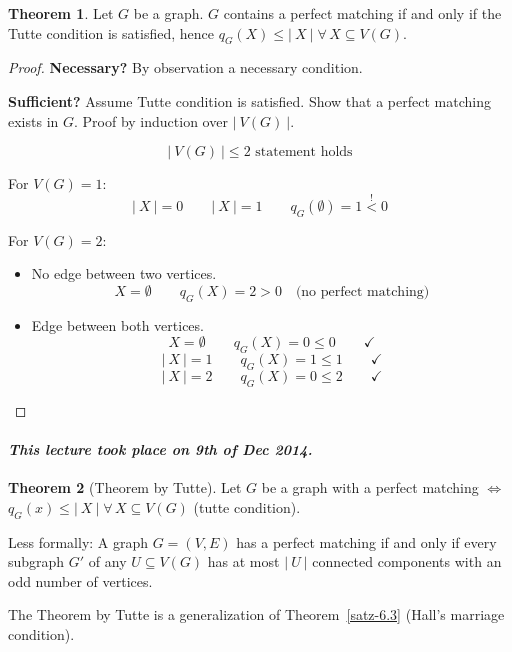 \documentclass[a4paper]{article}
\theoremstyle{definition}
\newtheorem{theorem}{Theorem}
\newcommand{\card}[1]{\left|\:\!#1\:\!\right|}
\newcommand{\dateref}[1]{\paragraph{\textit{This lecture took place on #1.}}}
\newcommand{\fall}{\;\forall\,}
\begin{document}
\begin{theorem}\label{satz-6.6}
  Let $G$ be a graph. $G$ contains a perfect matching if and only if the Tutte condition is satisfied,
  hence $q_G(X) \leq \card{X} \fall X \subseteq V(G)$.
\end{theorem}

\begin{proof}
  \textbf{Necessary?} By observation a necessary condition.

  \textbf{Sufficient?} Assume Tutte condition is satisfied. Show that a perfect matching exists in $G$.
  Proof by induction over $\card{V(G)}$.

  \[ \card{V(G)} \leq 2 \text{ statement holds} \]

  For $V(G) = 1$:
  \[  \card{X} = 0 \qquad \card{X} = 1 \qquad q_G(\emptyset) = 1 \stackrel{!}{<} 0 \]

  For $V(G) = 2$:
  \begin{itemize}
    \item No edge between two vertices.
      \[ X = \emptyset \qquad q_G(X) = 2 > 0 \quad \text{(no perfect matching)} \]
    \item Edge between both vertices.
      \[ X = \emptyset \qquad q_G(X) = 0 \leq 0 \qquad \checkmark \]
      \[ \card{X} = 1 \qquad q_G(X) = 1 \leq 1 \qquad \checkmark \]
      \[ \card{X} = 2 \qquad q_G(X) = 0 \leq 2 \qquad \checkmark \]
  \end{itemize}
\end{proof}

\dateref{9th of Dec 2014}

\begin{theorem}[Theorem by Tutte]
  Let $G$ be a graph with a perfect matching
  $\Leftrightarrow$ $q_G(x) \leq \card{X} \fall X \subseteq V(G)$ (tutte condition).

  Less formally:
  A graph $G = (V, E)$ has a perfect matching if and only if every subgraph $G'$
  of any $U \subseteq V(G)$ has at most $\card{U}$ connected components
  with an odd number of vertices.
\end{theorem}

The Theorem by Tutte is a generalization of Theorem~\ref{satz-6.3} (Hall's marriage condition).
\end{document}
